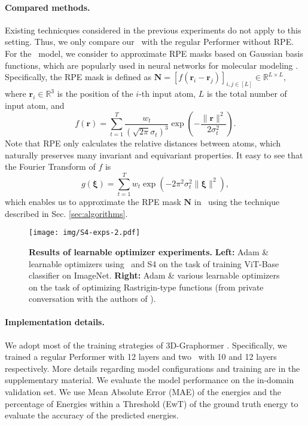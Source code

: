 \paragraph{Compared methods.}
Existing technicques considered in the previous experiments do not apply to this setting. Thus, we only compare our \FLT~with the regular Performer without RPE. For the \FLT~model, we consider to approximate RPE masks based on Gaussian basis functions, which are popularly used in neural networks for molecular modeling \cite{gasteiger2021gemnet, shi2022benchmarking, luo2023one}. Specifically, the RPE mask is defined as $\mathbf{N} = [f(\mathbf{r}_{i}-\mathbf{r}_{j})]_{i,j\in[L]} \in \mathbb{R}^{L \times L}$, where $\mathbf{r}_{i}\in \mathbb{R}^{3}$ is the position of the $i$-th input atom, $L$ is the total number of input atom, and
$$
    f(\mathbf{r}) = \sum_{t=1}^T \frac{w_t}{(\sqrt{2\pi}\sigma_t)^3} \exp\left(-\frac{\|\mathbf{r}\|^2}{2\sigma_t^2}\right).
$$
Note that  RPE only calculates the relative distances between atoms, which naturally preserves many invariant and equivariant properties.
It easy to see that the Fourier Transform of $f$ is 
$$
    g (\boldsymbol{\xi})=\sum_{t=1}^T w_t\exp\left(-2\pi^2\sigma_t^2\|\boldsymbol{\xi}\|^2\right),
$$
which enables us to approximate the RPE mask $\mathbf{N}$ in \FLTs~using the technique described in Sec. \ref{sec:algorithms}.

\begin{figure*}
    \centering
    \texttt{[image: img/S4-exps-2.pdf]}
    \caption{\textbf{Results of learnable optimizer experiments. } \textbf{Left:} \textrm{Adam} \& learnable optimizers using \FLT~and S4 on the task of training ViT-Base classifier on ImageNet. \textbf{Right:} Adam \& various learnable optimizers on the task of optimizing Rastrigin-type functions (from private conversation with the authors of \cite{jain2023mnemosyne}).}
    \label{fig:learn-opt}
\end{figure*}

\paragraph{Implementation details.} We adopt most of the training strategies of 3D-Graphormer \cite{shi2022benchmarking}. 
Specifically, we trained a regular Performer with 12 layers and two \FLT~with 10 and 12 layers respectively. 
More details regarding model configurations and training are in the supplementary material.
We evaluate the model performance on the in-domain validation set. We use Mean Absolute Error (MAE) of the energies and the percentage of Energies within a Threshold (EwT) of the ground truth energy to evaluate the accuracy of the predicted energies. 

